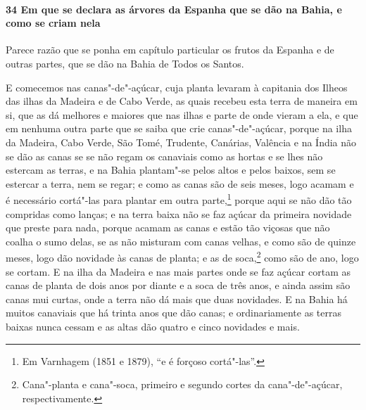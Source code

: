 \paragraph{34 Em que se declara as árvores da Espanha que se dão na Bahia, e como se criam
nela}

Parece razão que se ponha em capítulo particular os frutos da Espanha e de outras partes,
que se dão na Bahia de Todos os Santos.

E comecemos nas canas"-de"-açúcar, cuja planta levaram à capitania dos Ilheos das ilhas da
Madeira e de Cabo Verde, as quais recebeu esta terra de maneira em si, que as dá melhores
e maiores que nas ilhas e parte de onde vieram a ela, e que em nenhuma outra parte que se
saiba que crie canas"-de"-açúcar, porque na ilha da Madeira, Cabo Verde, São Tomé, Trudente,
Canárias, Valência e na Índia não se dão as canas se se não regam os canaviais como as
hortas e se lhes não estercam as terras, e na Bahia plantam"-se pelos altos e pelos baixos,
sem se estercar a terra, nem se regar; e como as canas são de seis meses, logo acamam e é
necessário cortá"-las para plantar em outra parte,\footnote{ Em Varnhagem (1851 e 1879),
``e é forçoso cortá"-las''.} porque aqui se não dão tão compridas como lanças; e na terra
baixa não se faz açúcar da primeira novidade que preste para nada, porque acamam as canas
e estão tão viçosas que não coalha o sumo delas, se as não misturam com canas velhas, e
como são de quinze meses, logo dão novidade às canas de planta; e as de soca,\footnote{
Cana"-planta e cana"-soca, primeiro e segundo cortes da cana"-de"-açúcar, respectivamente.}
como são de ano, logo se cortam. E na ilha da Madeira e nas mais partes onde se faz açúcar
cortam as canas de planta de dois anos por diante e a soca de três anos, e ainda assim são
canas mui curtas, onde a terra não dá mais que duas novidades. E na Bahia há muitos
canaviais que há trinta anos que dão canas; e ordinariamente as terras baixas nunca cessam
e as altas dão quatro e cinco novidades e mais.

